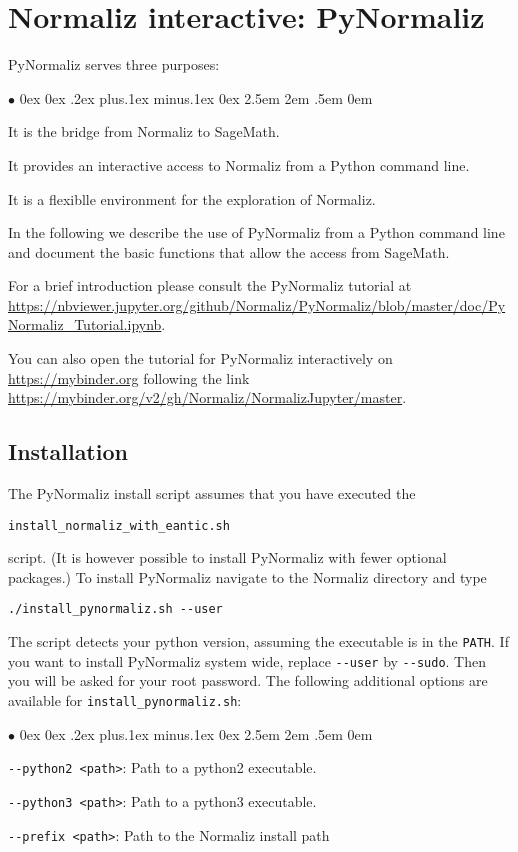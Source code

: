 \documentclass[12pt,a4paper]{scrartcl}
\newcommand{\stdli}{ \topsep0ex \partopsep0ex %
\parsep.2ex plus.1ex minus.1ex \itemsep0ex%
\leftmargin2.5em \labelwidth2em \labelsep.5em \rightmargin0em}%
\renewenvironment{itemize}{\begin{list}{{$\bullet$}}{\stdli}}{\end{list}}
\theoremstyle{definition}
\begin{document}
\newpage

\section{Normaliz interactive: PyNormaliz}\label{PyNormaliz}

\begin{small}
	
PyNormaliz serves three purposes:
\begin{itemize}
	\item It is the bridge from Normaliz to SageMath.
	\item It provides an interactive access to Normaliz from a Python command line.
	\item It is a flexiblle environment for the exploration of Normaliz.
\end{itemize}
In the following we describe the use of PyNormaliz from a Python command line and document the basic functions that allow the access from SageMath.

For a brief introduction please consult the PyNormaliz tutorial at \url{https://nbviewer.jupyter.org/github/Normaliz/PyNormaliz/blob/master/doc/PyNormaliz_Tutorial.ipynb}.

You can also open the tutorial for PyNormaliz interactively on \url{https://mybinder.org} following the link \url{https://mybinder.org/v2/gh/Normaliz/NormalizJupyter/master}.

\subsection{Installation}

The PyNormaliz install script assumes that you have executed the
\begin{center}
	\verb|install_normaliz_with_eantic.sh|
\end{center}
script. (It is however possible to install PyNormaliz with fewer optional packages.) To install PyNormaliz navigate to the Normaliz directory and type
\begin{Verbatim}
./install_pynormaliz.sh --user
\end{Verbatim}
The script detects your python version, assuming the executable is in the \verb|PATH|. If you want to install PyNormaliz system wide,
replace \verb|--user| by \verb|--sudo|. Then you will be asked for your root password.
The following additional options are available for \verb|install_pynormaliz.sh|:
\begin{itemize}
	\item \verb|--python2 <path>|: Path to a python2 executable.
	\item \verb|--python3 <path>|: Path to a python3 executable.
	\item \verb|--prefix <path>|: Path to the Normaliz install path
\end{itemize}


\end{small}
\end{document}
